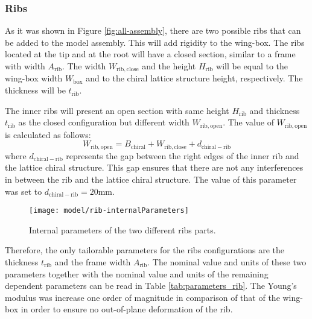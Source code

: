     \clearpage
    \subsubsection{Ribs} \label{subsubsec:Ribs_Parametrization}

    As it was shown in Figure \ref{fig:all-assembly}, there are two possible ribs that can be added to the model assembly. This will add rigidity to the wing-box. The ribs located at the tip and at the root will have a closed section, similar to a frame with width $A_{\mathrm{rib}}$. The width $W_{\mathrm{rib,close}}$ and the height $H_{\mathrm{rib}}$ will be equal to the wing-box width $W_{\mathrm{box}}$ and to the chiral lattice structure height, respectively. The thickness will be $t_{\mathrm{rib}}$.

    The inner ribs will present an open section with same height $H_{\mathrm{rib}}$ and thickness $t_{\mathrm{rib}}$ as the closed configuration but different width $W_{\mathrm{rib,open}}$. The value of $W_{\mathrm{rib,open}}$ is calculated as follows:
    $$
    W_{\mathrm{rib,open}} = B_{\mathrm{chiral}} + W_{\mathrm{rib,close}} + d_{\mathrm{chiral-rib}}
    $$
    where $d_{\mathrm{chiral-rib}}$ represents the gap between the right edges of the inner rib and the lattice chiral structure. This gap ensures that there are not any interferences in between the rib and the lattice chiral structure. The value of this parameter was set to $d_{\mathrm{chiral-rib}} = 20$mm.

    \begin{figure}[!htpb]
      \centering
      \texttt{[image: model/rib-internalParameters]}
      \caption[Internal parameters of the two different ribs parts]{Internal parameters of the two different ribs parts.}\label{fig:rib-internalParameters}
    \end{figure}

    Therefore, the only tailorable parameters for the ribs configurations are the thickness $t_{\mathrm{rib}}$ and the frame width $A_{\mathrm{rib}}$. The nominal value and units of these two parameters together with the nominal value and units of the remaining dependent parameters can be read in Table \ref{tab:parameters_rib}. The Young's modulus was increase one order of magnitude in comparison of that of the wing-box in order to ensure no out-of-plane deformation of the rib.

